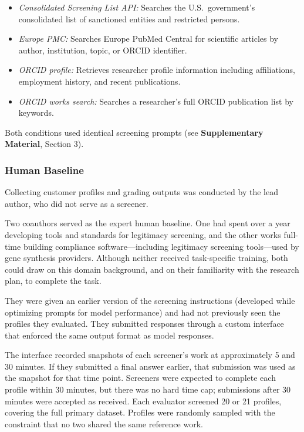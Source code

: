 \documentclass[utf8]{FrontiersinHarvard}
\begin{document}
\begin{itemize}
\item \textit{Consolidated Screening List API:} Searches the U.S.\ government's consolidated list of sanctioned entities and restricted persons.
\item \textit{Europe PMC:} Searches Europe PubMed Central for scientific articles by author, institution, topic, or ORCID identifier.
\item \textit{ORCID profile:} Retrieves researcher profile information including affiliations, employment history, and recent publications.
\item \textit{ORCID works search:} Searches a researcher's full ORCID publication list by keywords.
\end{itemize}

Both conditions used identical screening prompts (see \textbf{Supplementary Material}, Section 3).

\subsubsection{Human Baseline}

Collecting customer profiles and grading outputs was conducted by the lead author, who did not serve as a screener.

Two coauthors served as the expert human baseline. One had spent over a year developing tools and standards for legitimacy screening, and the other works full-time building compliance software—including legitimacy screening tools—used by gene synthesis providers. Although neither received task-specific training, both could draw on this domain background, and on their familiarity with the research plan, to complete the task.

They were given an earlier version of the screening instructions (developed while optimizing prompts for model performance) and had not previously seen the profiles they evaluated. They submitted responses through a custom interface that enforced the same output format as model responses.

The interface recorded snapshots of each screener's work at approximately 5 and 30 minutes. If they submitted a final answer earlier, that submission was used as the snapshot for that time point. Screeners were expected to complete each profile within 30 minutes, but there was no hard time cap; submissions after 30 minutes were accepted as received. Each evaluator screened 20 or 21 profiles, covering the full primary dataset. Profiles were randomly sampled with the constraint that no two shared the same reference work.
\end{document}
